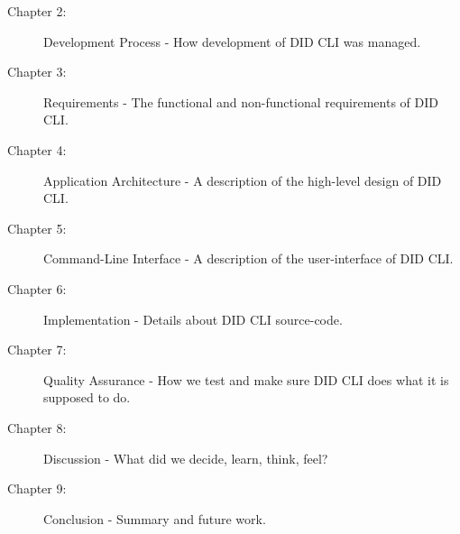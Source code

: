 \begin{description}
    \item[Chapter 2:] Development Process - How development of DID CLI was managed.
    \item[Chapter 3:] Requirements - The functional and non-functional requirements of DID CLI.
    \item[Chapter 4:] Application Architecture - A description of the high-level design of DID CLI.
    \item[Chapter 5:] Command-Line Interface - A description of the user-interface of DID CLI.
    \item[Chapter 6:] Implementation - Details about DID CLI source-code.
    \item[Chapter 7:] Quality Assurance - How we test and make sure DID CLI does what it is supposed to do. 
    \item[Chapter 8:] Discussion - What did we decide, learn, think, feel?
    \item[Chapter 9:] Conclusion - Summary and future work.
\end{description}
